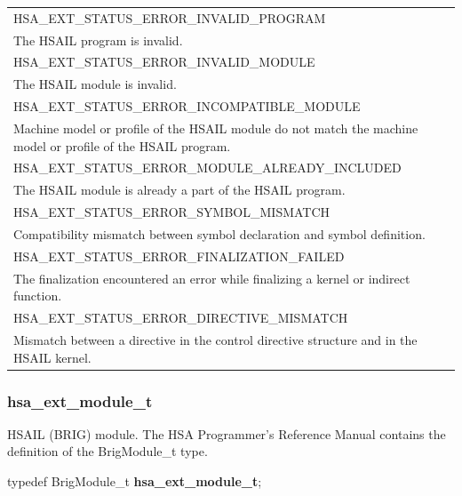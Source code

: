 \documentclass[final,oneside]{book}
\newcommand{\reftyp}[1]{#1}
\newcommand{\refenu}[1]{\reftyp{#1}}
\newenvironment{mylongtable}{\rowcolors{0}{lightgray}{lightgray}\longtable} {
\endlongtable}
\begin{document}
\begin{longtable}{@{\hspace{2em}}p{\linewidth-2em}}
\hspace{-2em}\refenu{HSA_\-EXT_\-STATUS_\-ERROR_\-INVALID_\-PROGRAM}\\The HSAIL program is invalid.\\[2mm]
\hspace{-2em}\refenu{HSA_\-EXT_\-STATUS_\-ERROR_\-INVALID_\-MODULE}\\The HSAIL module is invalid.\\[2mm]
\hspace{-2em}\refenu{HSA_\-EXT_\-STATUS_\-ERROR_\-INCOMPATIBLE_\-MODULE}\\Machine model or profile of the HSAIL module do not match the machine model or profile of the HSAIL program.\\[2mm]
\hspace{-2em}\refenu{HSA_\-EXT_\-STATUS_\-ERROR_\-MODULE_\-ALREADY_\-INCLUDED}\\The HSAIL module is already a part of the HSAIL program.\\[2mm]
\hspace{-2em}\refenu{HSA_\-EXT_\-STATUS_\-ERROR_\-SYMBOL_\-MISMATCH}\\Compatibility mismatch between symbol declaration and symbol definition.\\[2mm]
\hspace{-2em}\refenu{HSA_\-EXT_\-STATUS_\-ERROR_\-FINALIZATION_\-FAILED}\\The finalization encountered an error while finalizing a kernel or indirect function.\\[2mm]
\hspace{-2em}\refenu{HSA_\-EXT_\-STATUS_\-ERROR_\-DIRECTIVE_\-MISMATCH}\\Mismatch between a directive in the control directive structure and in the HSAIL kernel.
\end{longtable} 
\makeatletter{}

\subsubsection{hsa_\-ext_\-module_\-t}
\vspace{-2.5mm}HSAIL (BRIG) module. The HSA Programmer's Reference Manual contains the definition of the BrigModule_\-t type.\begin{mylongtable}{@{}p{\textwidth}}
\rule{0pt}{3ex}\rule[-2.5ex]{0pt}{0pt}typedef BrigModule_\-t  \hypertarget{group__ext-alt-finalizer-program_1gafc31798efdd1873a6ebe29d5b6bb3e88}{\textbf{hsa_\-ext_\-module_\-t}};
\end{mylongtable}
\end{document}
